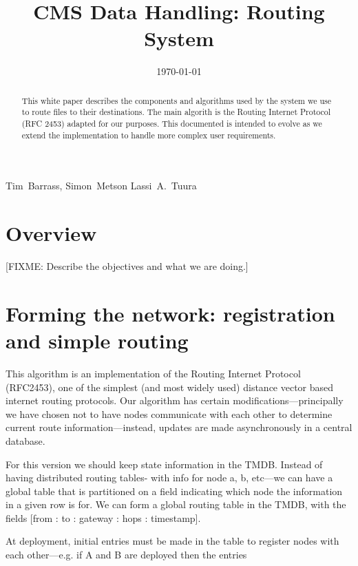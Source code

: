 \documentclass{cmspaper}
\begin{document}
\begin{titlepage}
  \whitepaper
  \date{\today}
  \title{CMS Data Handling: Routing System}

  \begin{Authlist}
    Tim~Barrass, Simon~Metson
    Lassi~A.~Tuura
  \end{Authlist}

  \begin{abstract}
    This white paper describes the components and algorithms used by
    the system we use to route files to their destinations.  The main
    algorith is the Routing Internet Protocol (RFC 2453) adapted for
    our purposes.  This documented is intended to evolve as we extend
    the implementation to handle more complex user requirements.
  \end{abstract} 

\end{titlepage}

\setcounter{page}{2}

\section{Overview}

[FIXME: Describe the objectives and what we are doing.]

\section{Forming the network: registration and simple routing}

This algorithm is an implementation of the Routing Internet Protocol
(RFC2453), one of the simplest (and most widely used) distance vector
based internet routing protocols. Our algorithm has certain
modifications---principally we have chosen not to have nodes
communicate with each other to determine current route
information---instead, updates are made asynchronously in a central
database.

For this version we should keep state information in the TMDB.
Instead of having distributed routing tables- with info for node a, b,
etc---we can have a global table that is partitioned on a field
indicating which node the information in a given row is for. We can
form a global routing table in the TMDB, with the fields [from : to :
gateway : hops : timestamp].

At deployment, initial entries must be made in the table to register
nodes with each other---e.g. if A and B are deployed then the entries
\end{document}
